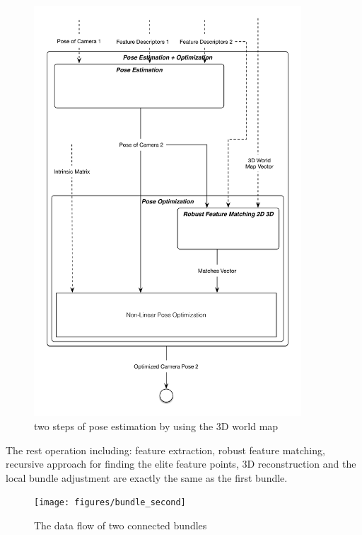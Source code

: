 \begin{figure}[H]
  \centering
  \includegraphics[width=100mm]{figures/pose_estimation_optimization}
  \caption{two steps of pose estimation by using the 3D world map}\label{fig:pose_estimation_optimization}
\end{figure}

The rest operation including: feature extraction, robust feature matching, recursive approach for finding the elite feature points, 3D reconstruction and the local bundle adjustment are exactly the same as the first bundle. 

\begin{figure}[H]
  \centering
  \texttt{[image: figures/bundle\_second]}
  \caption{The data flow of two connected bundles}\label{fig:bundle_second}
\end{figure}


